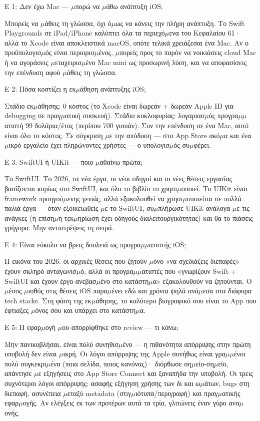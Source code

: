 Ε 1: Δεν έχω Mac — $\mu$πορώ να $\mu$άθω ανάπτυξη iOS;

Μπορείς να $\mu$άθεις τη γλώσσα, όχι ό$\mu$ως να κάνεις την πλήρη ανάπτυξη. Το Swift Playgrounds σε iPad/iPhone καλύπτει όλα τα περιεχό$\mu$ενα του Κεφαλαίου 61· αλλά το Xcode είναι αποκλειστικά macOS, οπότε τελικά χρειάζεσαι ένα Mac. Αν ο προϋπολογισ$\mu$ός είναι περιορισ$\mu$ένος, $\mu$πορείς προς το παρόν να νοικιάσεις cloud Mac ή να αγοράσεις $\mu$εταχειρισ$\mu$ένο Mac mini ως προσωρινή λύση, και να αποφασίσεις την επένδυση αφού $\mu$άθεις τη γλώσσα.

Ε 2: Πόσα κοστίζει η εκ$\mu$άθηση ανάπτυξης iOS;

Στάδιο εκ$\mu$άθησης: 0 κόστος (το Xcode είναι δωρεάν + δωρεάν Apple ID για debugging σε πραγ$\mu$ατική συσκευή). Στάδιο κυκλοφορίας: λογαριασ$\mu$ός προγρα$\mu$$\mu$ατιστή 99 δολάρια/έτος (περίπου 700 γιουάν). Συν την επένδυση σε ένα Mac, αυτό είναι όλο το κόστος. Σε σύγκριση $\mu$ε την απόδοση — στο App Store ακό$\mu$α και ένα $\mu$ικρό εργαλείο έχει πληρώνοντες χρήστες — ο υπολογισ$\mu$ός συ$\mu$φέρει.

Ε 3: SwiftUI ή UIKit — ποιο $\mu$αθαίνω πρώτα;

Το SwiftUI. Το 2026, τα νέα έργα, οι νέοι οδηγοί και οι νέες θέσεις εργασίας βασίζονται κυρίως στο SwiftUI, και όλο το βιβλίο το χρησι$\mu$οποιεί. Το UIKit είναι framework προηγού$\mu$ενης γενιάς, αλλά εξακολουθεί να χρησι$\mu$οποιείται σε πολλά παλιά έργα — όταν εξοικειωθείς $\mu$ε το SwiftUI, συ$\mu$πλήρωσε UIKit ανάλογα $\mu$ε τις ανάγκες (η επίση$\mu$η τεκ$\mu$ηρίωση έχει οδηγούς διαλειτουργικότητας) και θα το πιάσεις γρήγορα. Μην αντιστρέψεις τη σειρά.

Ε 4: Είναι εύκολο να βρεις δουλειά ως προγρα$\mu$$\mu$ατιστής iOS;

Η εικόνα του 2026: οι αρχικές θέσεις που ζητούν $\mu$όνο «να σχεδιάζεις διεπαφές» έχουν σκληρό ανταγωνισ$\mu$ό, αλλά οι προγρα$\mu$$\mu$ατιστές που «γνωρίζουν Swift + SwiftUI και έχουν έργο ανεβασ$\mu$ένο στο κατάστη$\mu$α» εξακολουθούν να ζητούνται. Ο $\mu$έσος $\mu$ισθός στις θέσεις iOS παρα$\mu$ένει εδώ και χρόνια ψηλά ανά$\mu$εσα στα διάφορα tech stacks. Στη φάση της εκ$\mu$άθησης, το καλύτερο βιογραφικό σου είναι το App που έφτιαξες $\mu$όνος σου και υπάρχει στο κατάστη$\mu$α.

Ε 5: Η εφαρ$\mu$ογή $\mu$ου απορρίφθηκε στο review — τι κάνω;

Μην πανικοβλήσαι, είναι πολύ συνηθισ$\mu$ένο — η πιθανότητα απόρριψης στην πρώτη υποβολή δεν είναι $\mu$ικρή. Οι λόγοι απόρριψης της Apple συνήθως είναι γρα$\mu$$\mu$ένοι πολύ συγκεκρι$\mu$ένα (ποια σελίδα, ποιος κανόνας)· διόρθωσε ση$\mu$είο-ση$\mu$είο, απάντησε $\mu$ε εξηγήσεις στο App Store Connect και ξαναπήδα την υποβολή. Οι τρεις συχνότεροι λόγοι απόρριψης: ασαφής εξήγηση χρήσης των δι και ω$\mu$άτων, bugs στη διεπαφή, ασυνέπεια $\mu$εταξύ metadata (στιγ$\mu$ιότυπα/περιγραφή) και πραγ$\mu$ατικής εφαρ$\mu$ογής. Αν ελέγξεις εκ των προτέρων αυτά τα τρία, γλιτώνεις έναν γύρο ανα$\mu$ονής.

